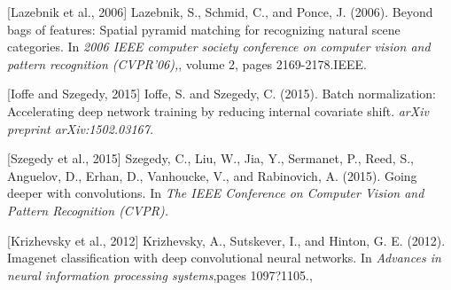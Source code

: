 \documentclass[12pt, a4paper, italian]{scrartcl}
\begin{document}
\begin{thebibliography}{9}
[Lazebnik et al., 2006] Lazebnik, S., Schmid, C., and Ponce, J. (2006). Beyond bags of features: Spatial pyramid matching for recognizing natural scene categories. In \emph{2006 IEEE computer society conference on computer vision and pattern recognition (CVPR'06),}, volume 2, pages 2169-2178.IEEE.

[Ioffe and Szegedy, 2015] Ioffe, S. and Szegedy, C. (2015). Batch normalization:
Accelerating deep network training by reducing internal covariate shift. \emph{arXiv
preprint arXiv:1502.03167.}

[Szegedy et al., 2015] Szegedy, C., Liu, W., Jia, Y., Sermanet, P., Reed, S.,
Anguelov, D., Erhan, D., Vanhoucke, V., and Rabinovich, A. (2015). Going
deeper with convolutions. In  \emph{The IEEE Conference on Computer Vision and
Pattern Recognition (CVPR).}

[Krizhevsky et al., 2012] Krizhevsky, A., Sutskever, I., and Hinton, G. E.
(2012). Imagenet classification with deep convolutional neural networks. In \emph{Advances in neural information processing systems},pages 1097?1105.,



\end{thebibliography}
\end{document}
